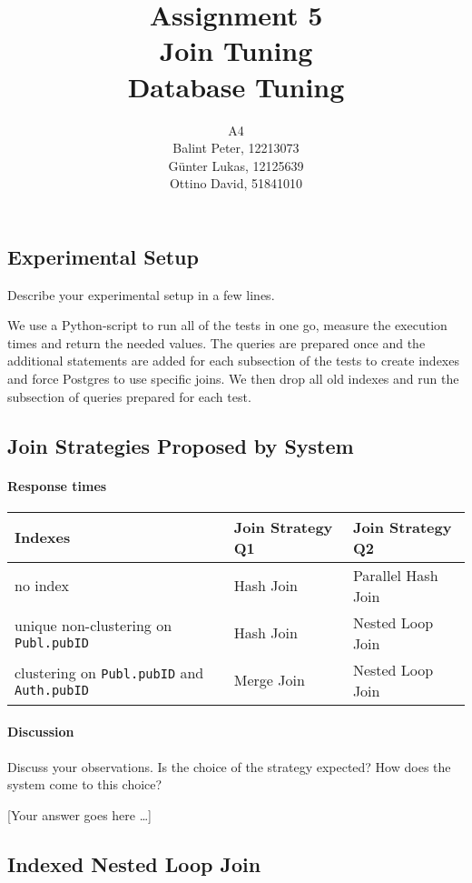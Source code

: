 \documentclass[11pt]{scrartcl}
\title{
  \textbf{\large Assignment 5} \\
  Join Tuning \\
  {\large Database Tuning}}
\author{
  A4 \\
  \large Balint Peter, 12213073 \\
  \large Günter Lukas, 12125639 \\
  \large Ottino David, 51841010
}
\newcommand{\youranswerhere}{[Your answer goes here \ldots]}
\begin{document}
\maketitle

\subsection*{Experimental Setup}

Describe your experimental setup in a few lines.

We use a Python-script to run all of the tests in one go, measure the execution times and return the needed values. The queries are prepared once and the additional statements are added for each subsection of the tests to create indexes and force Postgres to use specific joins. We then drop all old indexes and run the subsection of queries prepared for each test.

\subsection*{Join Strategies Proposed by System}

\paragraph{Response times}\mbox{}

\begin{table}[H]
  \centering
  \begin{tabular}{l|l|l}
    Indexes & Join Strategy Q1 & Join Strategy Q2 \tabularnewline
    \hline
    no index & Hash Join & Parallel Hash Join \tabularnewline
    unique non-clustering on \texttt{Publ.pubID} & Hash Join  & Nested Loop Join
      \tabularnewline
    clustering on \texttt{Publ.pubID} and \texttt{Auth.pubID} & Merge Join & Nested Loop Join
      \tabularnewline
  \end{tabular}
\end{table}

\paragraph{Discussion}

Discuss your observations. Is the choice of the strategy expected? How does the system come to this choice?

\youranswerhere{}

\subsection*{Indexed Nested Loop Join}
\end{document}
